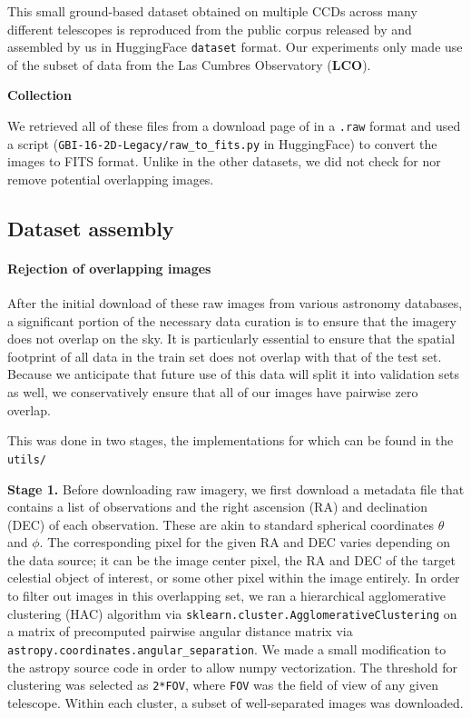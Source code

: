 This small ground-based dataset obtained on multiple CCDs across many different telescopes is reproduced from the public corpus released by  \citet{maireles2023efficient} and assembled by us in HuggingFace \texttt{dataset} format. Our experiments only made use of the subset of data from the Las Cumbres Observatory (\textbf{LCO}). 

\textbf{Collection}

We retrieved all of these files from a download page of \citet{maireles2023efficient} in a \texttt{.raw} format and used a script (\texttt{GBI-16-2D-Legacy/raw\_to\_fits.py} in HuggingFace) to convert the images to FITS format.  Unlike in the other datasets, we did not check for nor remove potential overlapping images.

\subsection{Dataset assembly}

\paragraph{Rejection of overlapping images}
After the initial download of these raw images from various astronomy databases, a significant portion of the necessary data curation is to ensure that the imagery does not overlap on the sky. It is particularly essential to ensure that the spatial footprint of all data in the train set does not overlap with that of the test set. Because we anticipate that future use of this data will split it into validation sets as well, we conservatively ensure that all of our images have pairwise zero overlap.

This was done in two stages, the implementations for which can be found in the \texttt{utils/}

\textbf{Stage 1.} Before downloading raw imagery, we first download a metadata file that contains a list of observations and the right ascension (RA) and declination (DEC) of each observation. These are akin to standard spherical coordinates $\theta$ and $\phi$. The corresponding pixel for the given RA and DEC varies depending on the data source; it can be the image center pixel, the RA and DEC of the target celestial object of interest, or some other pixel within the image entirely. In order to filter out images in this overlapping set, we ran a hierarchical agglomerative clustering (HAC) algorithm via \texttt{sklearn.cluster.AgglomerativeClustering} on a matrix of precomputed pairwise angular distance matrix via \texttt{astropy.coordinates.angular\_separation}. We made a small modification to the astropy source code in order to allow numpy vectorization. The threshold for clustering was selected as \texttt{2*FOV}, where \texttt{FOV} was the field of view of any given telescope. Within each cluster, a subset of well-separated images was downloaded.

